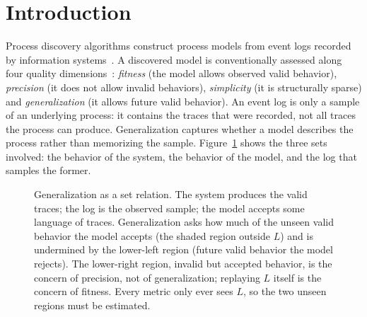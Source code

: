 \documentclass[runningheads]{llncs}
\begin{document}
\section{Introduction}
\label{sec:intro}

Process discovery algorithms construct process models from event logs recorded by information systems~\cite{vanderaalst2016pm}. A discovered model is conventionally assessed along four quality dimensions~\cite{buijs2014quality}: \emph{fitness} (the model allows observed valid behavior), \emph{precision} (it does not allow invalid behaviors), \emph{simplicity} (it is structurally sparse) and \emph{generalization} (it allows future valid behavior). An event log is only a sample of an underlying process: it contains the traces that were recorded, not all traces the process can produce. Generalization captures whether a model describes the process rather than memorizing the sample. Figure~\ref{fig:venn} shows the three sets involved: the behavior of the system, the behavior of the model, and the log that samples the former.

\begin{figure}[!ht]
\centering
{}
\caption{Generalization as a set relation. The system produces the valid traces; the log is the observed sample; the model accepts some language of traces. Generalization asks how much of the unseen valid behavior the model accepts (the shaded region outside $L$) and is undermined by the lower-left region (future valid behavior the model rejects). The lower-right region, invalid but accepted behavior, is the concern of precision, not of generalization; replaying $L$ itself is the concern of fitness. Every metric only ever sees $L$, so the two unseen regions must be estimated.}
\label{fig:venn}
\end{figure}
\end{document}
